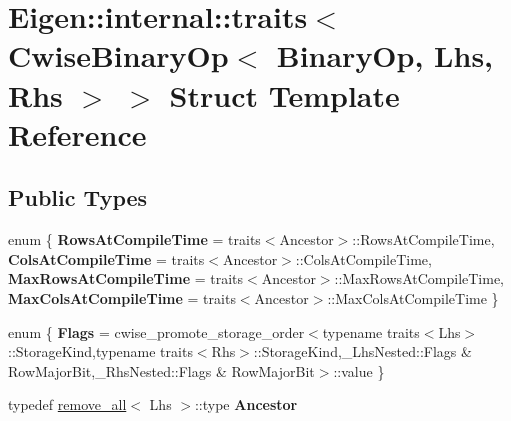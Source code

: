 \hypertarget{struct_eigen_1_1internal_1_1traits_3_01_cwise_binary_op_3_01_binary_op_00_01_lhs_00_01_rhs_01_4_01_4}{}\section{Eigen\+::internal\+::traits$<$ Cwise\+Binary\+Op$<$ Binary\+Op, Lhs, Rhs $>$ $>$ Struct Template Reference}
\label{struct_eigen_1_1internal_1_1traits_3_01_cwise_binary_op_3_01_binary_op_00_01_lhs_00_01_rhs_01_4_01_4}
\subsection*{Public Types}
\begin{DoxyCompactItemize}
\item 
\mbox{\label{struct_eigen_1_1internal_1_1traits_3_01_cwise_binary_op_3_01_binary_op_00_01_lhs_00_01_rhs_01_4_01_4_aa37511748e59baafc9a29f8463d08d1e}} 
enum \{ {\bfseries Rows\+At\+Compile\+Time} = traits$<$Ancestor$>$\+::Rows\+At\+Compile\+Time, 
{\bfseries Cols\+At\+Compile\+Time} = traits$<$Ancestor$>$\+::Cols\+At\+Compile\+Time, 
{\bfseries Max\+Rows\+At\+Compile\+Time} = traits$<$Ancestor$>$\+::Max\+Rows\+At\+Compile\+Time, 
{\bfseries Max\+Cols\+At\+Compile\+Time} = traits$<$Ancestor$>$\+::Max\+Cols\+At\+Compile\+Time
 \}
\item 
\mbox{\label{struct_eigen_1_1internal_1_1traits_3_01_cwise_binary_op_3_01_binary_op_00_01_lhs_00_01_rhs_01_4_01_4_af17bbad91d15b0e5df5a263dc6871780}} 
enum \{ {\bfseries Flags} = cwise\+\_\+promote\+\_\+storage\+\_\+order$<$typename traits$<$Lhs$>$\+::Storage\+Kind,typename traits$<$Rhs$>$\+::Storage\+Kind,\+\_\+\+Lhs\+Nested\+::Flags \& Row\+Major\+Bit,\+\_\+\+Rhs\+Nested\+::Flags \& Row\+Major\+Bit$>$\+::value
 \}
\item 
\mbox{\label{struct_eigen_1_1internal_1_1traits_3_01_cwise_binary_op_3_01_binary_op_00_01_lhs_00_01_rhs_01_4_01_4_afabc96be713b502009dfe217045d8248}} 
typedef \mbox{\hyperlink{struct_eigen_1_1internal_1_1remove__all}{remove\+\_\+all}}$<$ Lhs $>$\+::type {\bfseries Ancestor}

\end{DoxyCompactItemize}
